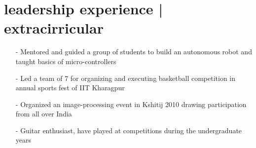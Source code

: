 \documentclass[a4paper, 10pt, oneside]{article}
\newcommand{\bulltetspace}{\vspace{-0.3em}}
\begin{document}
\vspace{-0.5em}
\section{\color{headings}leadership experience | extracirricular}
\color{text1}
\begin{center}
\begin{itemize}
\bulltetspace
\item[-] Mentored and guided a group of students to build an autonomous robot and taught basics of micro-controllers\\
\bulltetspace
\item[-] Led a team of 7 for organizing and executing basketball competition in annual sports fest of IIT Kharagpur\\
\bulltetspace
\item[-] Organized an image-processing event in Kshitij 2010 drawing participation from all over India\\
\bulltetspace
\item[-] Guitar enthusiast, have played at competitions during the undergraduate years

\bulltetspace
\end{itemize}
\end{center}
\vspace{-1em}
\end{document}
